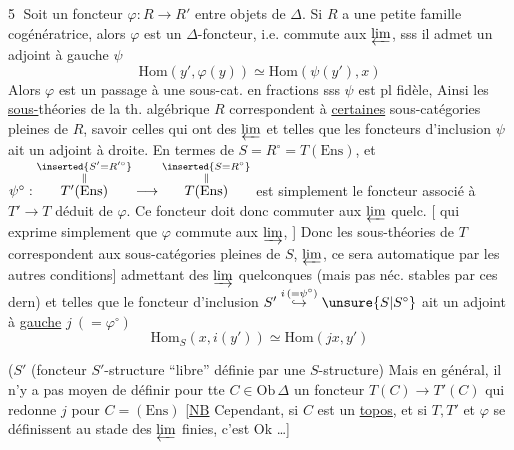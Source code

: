\textcircled{5} Soit un foncteur $\varphi:R\longrightarrow R'$ entre objets de $\Delta$. Si $R$ a une petite famille cogénératrice, alors $\varphi$ est un $\Delta$-foncteur, i.e. commute aux $\varprojlim$, sss il admet un adjoint à gauche $\psi$
\[
\mathrm{Hom}(y',\varphi(y))\simeq\mathrm{Hom}(\psi(y'),x)
\]
Alors $\varphi$ est un passage à une sous-cat.  en fractions sss  $\psi$ est pl fidèle,  Ainsi les \uline{sous-}théories  de la th. algébrique $R$ correspondent  à \uline{certaines} sous-catégories pleines de $R$, savoir celles qui ont des $\varprojlim$ et telles que les foncteurs d'inclusion $\psi$ ait un adjoint à  droite. En termes de $S=R^\circ=T(\mathrm{Ens})$, et  
 $\psi^\circ:\overset{\substack{\inserted{S'=R'^\circ}\\\Vert}}{T'(\mathrm{Ens})}\longrightarrow\overset{\substack{\inserted{S=R^\circ}\\\Vert}}{T(\mathrm{Ens})}$ est simplement le foncteur associé à $T'\longrightarrow T$ déduit de $\varphi$. Ce foncteur doit donc commuter aux $\varprojlim$ quelc. [ qui exprime simplement que $\varphi$ commute aux $\varinjlim$, ] Donc les sous-théories de $T$ correspondent aux sous-catégories pleines  de $S$,  \inserted{[stables par} $\varprojlim$, ce sera automatique par les autres conditions] admettant des $\varinjlim$ quelconques (mais pas néc. stables par ces dern) et telles que le foncteur d'inclusion $S'\overset{i\,(=\psi^\circ)}{\hookrightarrow}\unsure{S|S^\circ}$ ait un adjoint à \uline{gauche} \deleted{$\unsure{\varphi}$} $j\ (= \varphi^\circ)$
\[
\mathrm{Hom}_{S}(x,i(y'))\simeq\mathrm{Hom}(jx,y')
\]

 \deleted{[Mais en général on (Structure} ($S'$ (foncteur $S'$-structure ``libre'' définie par une $S$-structure) Mais en général, il n'y a pas moyen de définir pour tte $C\in\mathrm{Ob}\,\Delta$ un foncteur $T(C)\longrightarrow T'(C)$ qui  redonne $j$  pour $C=(\mathrm{Ens})$ [\uline{NB} Cependant, si $C$ est un \uline{topos}, et si $T,T'$ et $\varphi$ se définissent au stade des $\varprojlim$ finies, c'est Ok \ldots]

